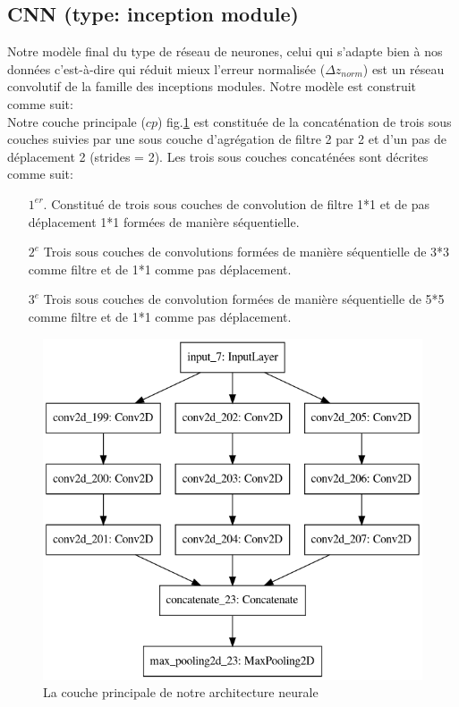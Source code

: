 \subsection{CNN (type: inception module)}
Notre modèle final du type de réseau de neurones, celui qui s'adapte bien à nos données c'est-à-dire qui réduit mieux l'erreur normalisée ($\Delta z_{norm}$) est un réseau convolutif de la famille des inceptions modules. Notre modèle est construit comme suit: \\ Notre couche principale ($cp$) fig.\ref{archi_neural} est constituée de la concaténation de trois sous couches suivies par une sous couche d'agrégation de filtre 2 par 2 et d'un pas de déplacement 2 (strides = 2). Les trois sous couches concaténées sont décrites comme suit:
\begin{itemize}
	\item[$1^{er}$.] Constitué de trois sous couches de convolution de filtre 1*1 et de pas déplacement 1*1 formées de manière séquentielle.
	\item[$2^e$] Trois sous couches de convolutions formées de manière séquentielle de 3*3 comme filtre et de 1*1 comme pas déplacement.
	\item[$3^e$] Trois sous couches de convolution formées de manière séquentielle de 5*5 comme filtre et de 1*1 comme pas déplacement.
\end{itemize} 
\begin{figure}[H]
	\includegraphics[scale = 0.5]{images/kernel.png}
	\caption{La couche principale de notre architecture neurale}
	\label{archi_neural}
\end{figure}
